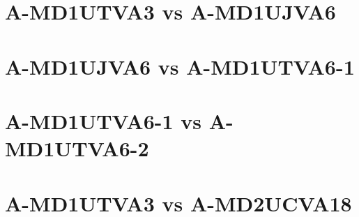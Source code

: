 \documentclass[10pt,a4paper]{report}
\begin{document}
\section{A-MD1UTVA3 vs A-MD1UJVA6}

\section{A-MD1UJVA6 vs A-MD1UTVA6-1}

\section{A-MD1UTVA6-1 vs A-MD1UTVA6-2}

\section{A-MD1UTVA3 vs A-MD2UCVA18}
\end{document}
